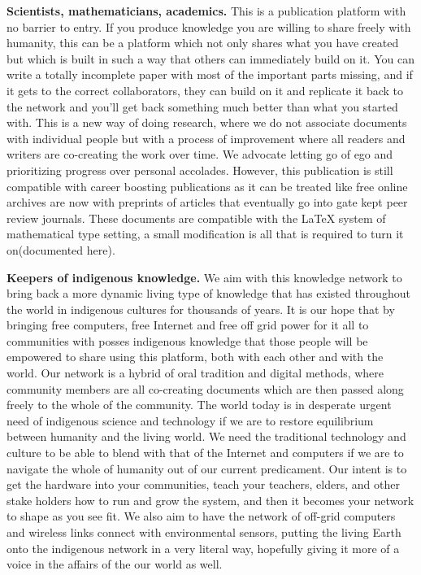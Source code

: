 \textbf{Scientists, mathematicians, academics.} This is a publication
platform with no barrier to entry. If you produce knowledge you are
willing to share freely with humanity, this can be a platform which not
only shares what you have created but which is built in such a way that
others can immediately build on it. You can write a totally incomplete
paper with most of the important parts missing, and if it gets to the
correct collaborators, they can build on it and replicate it back to the
network and you'll get back something much better than what you started
with. This is a new way of doing research, where we do not associate
documents with individual people but with a process of improvement where
all readers and writers are co-creating the work over time. We advocate
letting go of ego and prioritizing progress over personal accolades.
However, this publication is still compatible with career boosting
publications as it can be treated like free online archives are now with
preprints of articles that eventually go into gate kept peer review
journals. These documents are compatible with the LaTeX system of
mathematical type setting, a small modification is all that is required
to turn it on(documented here).

\textbf{Keepers of indigenous knowledge.} We aim with this knowledge
network to bring back a more dynamic living type of knowledge that has
existed throughout the world in indigenous cultures for thousands of
years. It is our hope that by bringing free computers, free Internet and
free off grid power for it all to communities with posses indigenous
knowledge that those people will be empowered to share using this
platform, both with each other and with the world. Our network is a
hybrid of oral tradition and digital methods, where community members
are all co-creating documents which are then passed along freely to the
whole of the community. The world today is in desperate urgent need of
indigenous science and technology if we are to restore equilibrium
between humanity and the living world. We need the traditional
technology and culture to be able to blend with that of the Internet and
computers if we are to navigate the whole of humanity out of our current
predicament. Our intent is to get the hardware into your communities,
teach your teachers, elders, and other stake holders how to run and grow
the system, and then it becomes your network to shape as you see fit. We
also aim to have the network of off-grid computers and wireless links
connect with environmental sensors, putting the living Earth onto the
indigenous network in a very literal way, hopefully giving it more of a
voice in the affairs of the our world as well.

